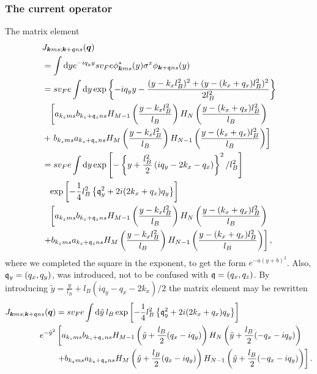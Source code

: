 \subsubsection{The current operator}
The matrix element
\begin{align}
  &J_{\vec{k}ms; \vec{k}+\qvec{q} ns}(\vec{q})\\
  \nonumber &=  \int \mathrm{d}y
    e^{-iq_yy} sv_Fe \phi ^{*}_{\vec{k} ms}(y)
    \sigma ^x
    \phi _{\vec{k} +\qvec{q} ns}(y)\\
  &= s v_F e \int \mathrm{d}y
    \exp \left\{
    - i q_yy - \frac{(y-k_xl_B^2)^2 + (y-(k_x + q_x) l_B^2)^2}{2 l_B^2}
    \right\}\\
  \nonumber &\pe \left[
    a_{k_zms}b_{k_z + \qvec{q}_z ns} H_{M-1} \left( \frac{y - k_xl_B^2}{l_B} \right) H_N\left( \frac{y - (k_x + q_x) l_B^2}{l_B} \right)\right.\\
  \nonumber &+
    \left.  b_{k_zms} a_{k_z + \qvec{q}_z ns}
    H_M \left( \frac{y - k_xl_B^2}{l_B} \right)
    H_{N-1} \left( \frac{y - (k_x+ q_x) l_B^2}{l_B} \right)
    \right]\\
  &= s v_F e \int \mathrm{d}y
    \exp \left[-\left\{
    y+ \frac{l_B^2}{2} \left( iq_y - 2k_x - q_x \right)
    \right\}^2 /l_B^2\right]\\
  \nonumber &\pe \exp \left[- \frac{1}{4} l_B^2 \left\{
    \qvec{q}_y^2 + 2 i (2k_x + q_x) q_y 
    \right\}\right]\\
  \nonumber &\pe \left[
    a_{k_zms}b_{k_z + \qvec{q}_z ns} H_{M-1} \left( \frac{y - k_xl_B^2}{l_B} \right) H_N\left( \frac{y - (k_x + q_x) l_B^2}{l_B} \right) \right.\\
  \nonumber &\left. +
    b_{k_zms} a_{k_z + \qvec{q}_z ns}
    H_M \left( \frac{y - k_xl_B^2}{l_B} \right)
    H_{N-1} \left( \frac{y - (k_x + q_x) l_B^2}{l_B} \right)
    \right],
\end{align}
where we completed the square in the exponent, to get the form $e^{-a(y + b)^2}$.
Also, $\mathfrak{q}_y=(q_x, q_y)$, was introduced, not to be confused with $\mathfrak{q} = (q_x, q_z)$.
By introducing $\tilde{y} = \frac{y}{l_{B}} + l_B(iq_y - q_x - 2 k_x) / 2$ the matrix element may be rewritten
\begin{equation}
  \label{eq:73}
  \begin{split}
    J_{\bm{k}ms; \bm{k}+\mathfrak{q} ns}(\bm{q}) &=
    s v_F e \int \mathrm{d}\tilde{y} \: l_B
\exp \left[- \frac{1}{4} l_B^2 \left\{
    \mathfrak{q}_y^2 + 2 i (2k_x + q_x) q_y 
    \right\}\right]\\
  e^{-\tilde{y}^2}
   &\left[
    a_{k_zms}b_{k_z + \mathfrak{q}_z ns}
    H_{M-1} \left( \tilde{y} + \frac{l_B}{2}(q_x - iq_y) \right)
    H_N\left( \tilde{y} + \frac{l_B}{2}(-q_x - iq_y) \right) \right.\\
   &\left. +
    b_{k_zms} a_{k_z + \mathfrak{q}_z ns}
    H_M \left( \tilde{y} + \frac{l_B}{2}(q_x - iq_y) \right)
    H_{N-1} \left( \tilde{y} +  \frac{l_B}{2}(-q_x - iq_y)\right)
    \right].
  \end{split}
\end{equation}
